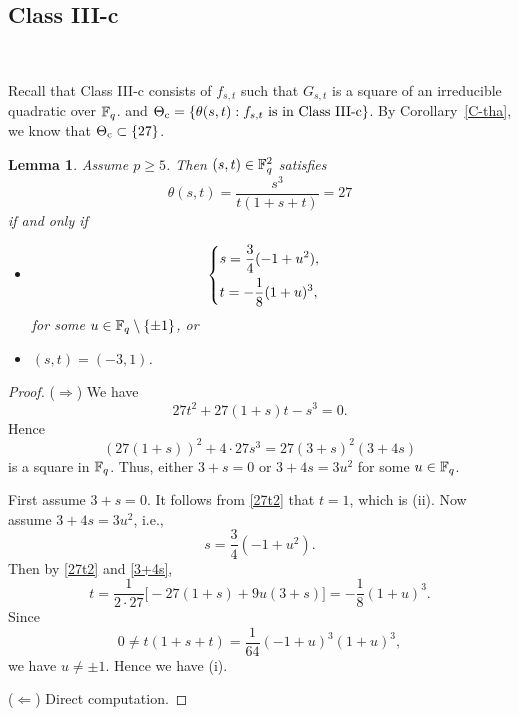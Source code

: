 \documentclass{amsart}
\newtheorem{lem}[thm]{Lemma}
\numberwithin{equation}{section}
\theoremstyle{definition}
\newcommand{\f}{\Bbb F}
\begin{document}
\subsection{Class III-c}\

Recall that Class III-c consists of $f_{s,t}$ such that $G_{s,t}$ is a square of an irreducible quadratic over $\f_q$. and $\Theta_{\rm c}=\{\theta(s,t): f_{s,t}\ \text{is in Class III-c}\}$. By Corollary~\ref{C-tha}, we know that $\Theta_{\rm c}\subset\{27\}$.

\begin{lem}\label{tha=27}
Assume $p\ge 5$. Then
$(s,t)\in\f_q^2$ satisfies 
\[
\theta(s,t)=\frac{s^3}{t(1+s+t)}=27
\]
if and only if
\begin{itemize}
\item[(i)]
\[
\begin{cases}
s=\displaystyle\frac 34(-1+u^2),\vspace{0.4em}\cr
t=-\displaystyle\frac 18(1+u)^3,
\end{cases}
\]
for some $u\in\f_q\setminus\{\pm 1\}$, or
\medskip
\item[(ii)] $(s,t)=(-3,1)$.
\end{itemize}
\end{lem}

\begin{proof}
($\Rightarrow$) We have
\begin{equation}\label{27t2}
27t^2+27(1+s)t-s^3=0.
\end{equation}
Hence
\begin{equation}\label{3+4s}
(27(1+s))^2+4\cdot 27s^3=27(3+s)^2(3+4s)
\end{equation}
is a square in $\f_q$. Thus, either $3+s=0$ or $3+4s=3u^2$ for some $u\in\f_q$. 

First assume $3+s=0$. It follows from \eqref{27t2} that $t=1$, which is (ii).
Now assume $3+4s=3u^2$, i.e.,
\[
s=\frac 34(-1+u^2).
\]
Then by \eqref{27t2} and \eqref{3+4s}, 
\[
t=\frac 1{2\cdot 27}\bigl[-27(1+s)+9u(3+s)\bigr]=-\frac 18(1+u)^3.
\]
Since 
\[
0\ne t(1+s+t)=\frac 1{64}(-1+u)^3(1+u)^3,
\]
we have $u\ne\pm 1$. Hence we have (i).

\medskip
($\Leftarrow$) Direct computation.
\end{proof}
\end{document}
